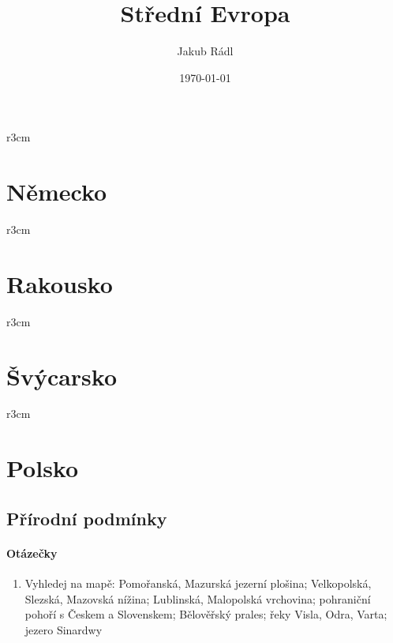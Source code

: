 \documentclass[10pt,a4paper]{article}
\title{Střední Evropa}
\date{\today}
\author{Jakub Rádl}
\begin{document}
\maketitle
\tableofcontents
\newpage
\mbox{}
\vspace{-1.5cm}
\begin{wrapfigure}{r}{3cm}
\vspace{-200pt}
\end{wrapfigure}
\section{Německo}



\newpage
\mbox{}
\vspace{-1.5cm}
\begin{wrapfigure}{r}{3cm}
\vspace{-200pt}
\end{wrapfigure}
\section{Rakousko}



\newpage
\mbox{}
\vspace{-1.5cm}
\begin{wrapfigure}{r}{3cm}
\vspace{-200pt}
\end{wrapfigure}
\section{Švýcarsko}



\newpage
\mbox{}
\vspace{-1.5cm}
\begin{wrapfigure}{r}{3cm}
\vspace{-200pt}
\end{wrapfigure}
\section{Polsko}
\subsection{Přírodní podmínky}
\paragraph{Otázečky}
\begin{enumerate}
\item Vyhledej na mapě: Pomořanská, Mazurská jezerní plošina; Velkopolská, Slezská, Mazovská nížina; Lublinská, Malopolská vrchovina; pohraniční pohoří s Českem a Slovenskem; Bělověřský prales; řeky Visla, Odra, Varta; jezero Sinardwy
\end{enumerate}
\end{document}
